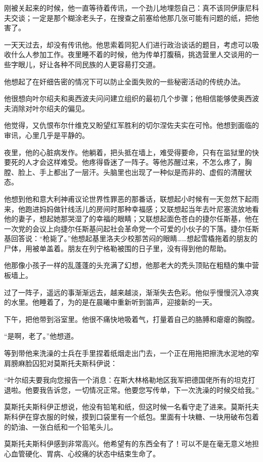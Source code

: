 刚被关起来的时候，他一直等待着传讯，一个劲儿地埋怨自己：真不该同伊康尼科夫交谈；一定是那个糊涂老头子，在搜查之前塞给他那几张可能有问题的纸，把他害了。

一天天过去，却没有传讯他。他思索着同犯人们进行政治谈话的题目，考虑可以吸收什么人参加工作。夜里睡不着的时候，他为传单打腹稿，挑选营里人交谈用的一些字眼儿，好让各种不同民族的人更容昜打交道。

他想起了在奸细告密的情况下可以防止全面失败的一些秘密活动的传统办法。

他很想向叶尔绍夫和奥西波夫问问建立组织的最初几个步骤；他相信能够使奥西波夫消除对叶尔绍夫的偏见。

他觉得，又仇恨布尔什维克又盼望红军胜利的切尔涅佐夫实在可怜。他想到面临的审讯，心里几乎是平静的。

夜里，他的心脏病发作。他躺着，把头抵在墙上，难受得要命，只有在监狱里的快要死的人才会这样难受。他疼得昏迷了一阵子。等他苏醒过来，不怎么疼了，胸膛、脸上、手上都出了一层汗。头脑里也出现了一种似是而非的、虚假的清醒状态。

他想到他和意大利神甫议论世界性罪恶的那番话，联想起小时候有一天忽然下起雨来，他跑进妈妈做针线活儿的房间时那种幸福感；又联想起当年去叶尼塞流放地看他的妻子，想起她那哭湿了的幸福的眼睛；又联想起面色苍白的捷尔任斯基，他在一次党的会议上向捷尔任斯基问起社会革命党一个可爱的小伙子的下落。捷尔任斯基回答说：“枪毙了。”他想起基里洛夫少校那苦闷的眼睛……想起雪橇拖着的朋友的尸体，用被单盖着。朋友在列宁格勒被围的日子里，没有得到他的帮助。

他那像小孩子一样的乱蓬蓬的头充满了幻想，他那老大的秃头顶贴在粗糙的集中营板墙上。

过了一阵子，遥远的事渐渐远去，越来越淡，渐渐失去色彩。他似乎慢慢沉入凉爽的水里。他睡着了，为的是在晨曦中重新听到笛声，迎接新的一天。

下午，把他带到浴室里。他很不痛快地吸着气，打量着自己的胳膊和瘪瘪的胸膛。

“是啊，老了。”他想道。

等到带他来洗澡的士兵在手里捏着纸烟走出门去，一个正在用拖把擦洗水泥地的窄肩膀麻脸囚犯对莫斯托夫斯科伊说：

“叶尔绍夫要我向您报告一个消息：在斯大林格勒地区我军把德国佬所有的坦克打退啦。他要我告诉您，一切情况正常。他要您写传单，下一次洗澡的时候交给我。”

莫斯托夫斯科伊正想说，他没有铅笔和纸，但这时候一名看守走了进来。莫斯托夫斯科伊在穿衣服的时候，摸到口袋里有一个纸包。里面有十块糖、一块用破布包着的奶油、一张白纸和一个铅笔头儿。

莫斯托夫斯科伊感到非常高兴。他希望有的东西全有了！可以不是在毫无意义地担心血管硬化、胃病、心绞痛的状态中结束生命了。

